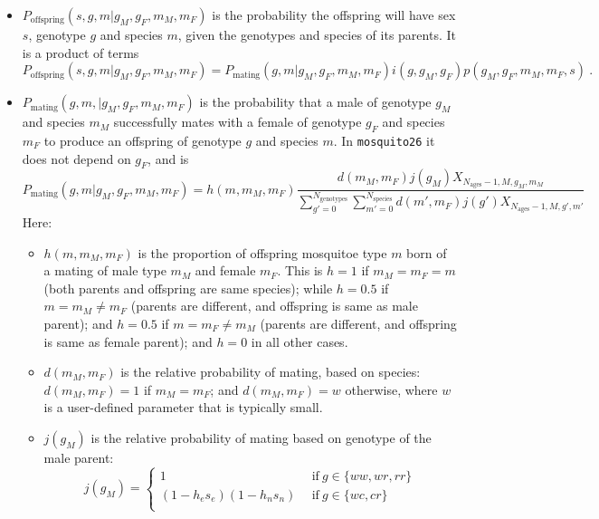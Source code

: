 \documentclass[11pt,a4paper]{article}
\begin{document}
\begin{itemize}
\item $P_{\mathrm{offspring}}(s, g, m | g_{M}, g_{F}, m_{M}, m_{F})$ is the probability the offspring will have sex $s$, genotype $g$ and species $m$, given the genotypes and species of its parents.  It is a product of terms
\begin{equation}
P_{\mathrm{offspring}}(s, g, m | g_{M}, g_{F}, m_{M}, m_{F}) = P_{\mathrm{mating}}(g, m | g_{M}, g_{F}, m_{M}, m_{F}) i(g, g_{M}, g_{F})p(g_{M}, g_{F}, m_{M}, m_{F}, s) \ .
\end{equation}
\item $P_{\mathrm{mating}}(g, m, | g_{M}, g_{F}, m_{M}, m_{F})$ is the probability that a male of genotype $g_{M}$ and species $m_{M}$ successfully mates with a female of genotype $g_{F}$ and species $m_{F}$ to produce an offspring of genotype $g$ and species $m$.  In {\tt mosquito26} it does not depend on $g_{F}$, and is
  \begin{equation}
    P_{\mathrm{mating}}(g, m | g_{M}, g_{F}, m_{M}, m_{F}) = h(m, m_{M}, m_{F})\frac{d(m_{M}, m_{F})j(g_{M}) X_{N_{\mathrm{ages}} - 1, M, g_{M}, m_{M}}}{\sum_{g'=0}^{N_{\mathrm{genotypes}}}\sum_{m'=0}^{N_{\mathrm{species}}}d(m', m_{F})j(g') X_{N_{\mathrm{ages}} - 1, M, g', m'}}
  \end{equation}
  Here:
  \begin{itemize}
  \item $h(m, m_{M}, m_{F})$ is the proportion of offspring mosquitoe type $m$ born of a mating of male type $m_{M}$ and female $m_{F}$.  This is $h = 1$ if $m_{M}=m_{F}=m$ (both parents and offspring are same species); while $h=0.5$ if $m = m_{M}\neq m_{F}$ (parents are different, and offspring is same as male parent); and $h=0.5$ if $m = m_{F} \neq m_{M}$ (parents are different, and offspring is same as female parent); and $h=0$ in all other cases.
  \item $d(m_{M}, m_{F})$ is the relative probability of mating, based on species: $d(m_{M}, m_{F}) = 1$ if $m_{M} = m_{F}$; and $d(m_{M}, m_{F}) = w$ otherwise, where $w$ is a user-defined parameter that is typically small.
  \item $j(g_{M})$ is the relative probability of mating based on genotype of the male parent:
    \begin{equation}
      j(g_{M}) = \left\{
      \begin{array}{ll}
        1 & \ \ \mbox{if}\ g\in\{ww, wr, rr\} \\
        (1 - h_{e}s_{e})(1 - h_{n}s_{n}) & \ \ \mbox{if}\ g\in\{wc, cr\} \\

\end{array}
\end{equation}
\end{itemize}
\end{itemize}
\end{document}
